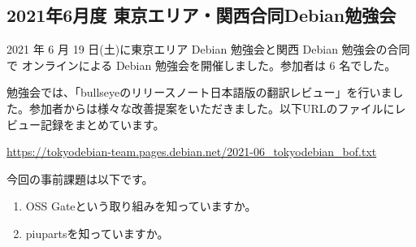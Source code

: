 \documentclass[mingoth,a4paper]{jsarticle}
\begin{document}

\subsection{2021年6月度 東京エリア・関西合同Debian勉強会}

2021 年 6 月 19 日(土)に東京エリア Debian 勉強会と関西 Debian 勉強会の合同で
オンラインによる Debian 勉強会を開催しました。参加者は 6 名でした。

勉強会では、「bullseyeのリリースノート日本語版の翻訳レビュー」を行いました。参加者からは様々な改善提案をいただきました。以下URLのファイルにレビュー記録をまとめています。

\url{https://tokyodebian-team.pages.debian.net/2021-06_tokyodebian_bof.txt}



今回の事前課題は以下です。

\begin{enumerate}
  \item OSS Gateという取り組みを知っていますか。
  \item piupartsを知っていますか。
\end{enumerate}


\begin{multicols}{2}
{\small
  
}
\end{multicols}

%
%
%
% 





\end{document}
